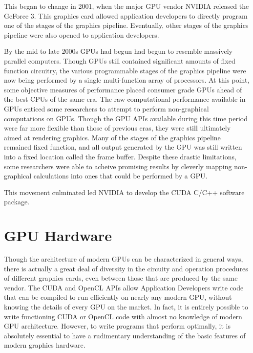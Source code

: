 \documentclass[12pt,twoside]{reedthesis}
\begin{document}
This began to change in 2001, when the major GPU vendor NVIDIA released the GeForce 3. This graphics card allowed application developers to directly program one of the stages of the graphics pipeline. Eventually, other stages of the graphics pipeline were also opened to application developers.

By the mid to late 2000s GPUs had begun had begun to resemble massively parallel computers. Though GPUs still contained significant amounts of fixed function circuitry, the various programmable stages of the graphics pipeline were now being performed by a single multi-function array of processors. At this point, some objective measures of performance placed consumer grade GPUs ahead of the best CPUs of the same era. The raw computational performance available in GPUs enticed some researchers to attempt to perform non-graphical computations on GPUs. Though the GPU APIs available during this time period were far more flexible than those of previous eras, they were still ultimately aimed at rendering graphics. Many of the stages of the graphics pipeline remained fixed function, and all output generated by the GPU was still written into a fixed location called the frame buffer. Despite these drastic limitations, some researchers were able to acheive promising results by cleverly mapping non-graphical calculations into ones that could be performed by a GPU.

This movement culminated led NVIDIA to develop the CUDA C/C++ software package.





\chapter{GPU Hardware}
Though the architecture of modern GPUs can be characterized in general ways, there is actually a great deal of diversity in the circuity and operation procedures of different graphics cards, even between those that are produced by the same vendor. The CUDA and OpenCL APIs allow Application Developers write code that can be compiled to run efficiently on nearly any modern GPU, without knowing the details of every GPU on the market. In fact, it is entirely possible to write functioning CUDA or OpenCL code with almost no knowledge of modern GPU architecture. However, to write programs that perform optimally, it is absolutely essential to have a rudimentary understanding of the basic features of modern graphics hardware.
\end{document}
